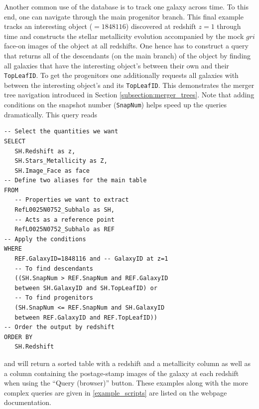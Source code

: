Another common use of the database is to track one galaxy across time. To this
end, one can navigate through the main progenitor branch. This final example
tracks an interesting object (\GalaxyID$=1848116$) discovered at redshift $z=1$
through time and constructs the stellar metallicity evolution accompanied by
the mock $gri$ face-on images of the object at all redshifts. One hence has to
construct a query that returns all of the descendants (on the main branch) of
the object by finding all galaxies that have the interesting object's \GalaxyID
between their own \GalaxyID and their {\tt TopLeafID}. To get the progenitors
one additionally requests all galaxies with \GalaxyID between the interesting
object's \GalaxyID and its {\tt TopLeafID}.  This demonstrates the merger tree
navigation introduced in Section \ref{subsection:merger_trees}. Note that
adding conditions on the snapshot number ({\tt SnapNum}) helps speed up the
queries dramatically. This query reads

{
\sqlstyle
{
\footnotesize
\begin{lstlisting}[numbers = none,caption={Returns the evolution along the main
branch of stellar metallicity with redshift of a given galaxy with its images.
To return the evolution along all branches replace \tt{TopLeafID} with
\tt{LastProjID} in line 20.}]
-- Select the quantities we want
SELECT      
   SH.Redshift as z,      
   SH.Stars_Metallicity as Z,      
   SH.Image_Face as face      
-- Define two aliases for the main table
FROM      
   -- Properties we want to extract      
   RefL0025N0752_Subhalo as SH,      
   -- Acts as a reference point      
   RefL0025N0752_Subhalo as REF      
-- Apply the conditions      
WHERE      
   REF.GalaxyID=1848116 and -- GalaxyID at z=1      
   -- To find descendants      
   ((SH.SnapNum > REF.SnapNum and REF.GalaxyID      
   between SH.GalaxyID and SH.TopLeafID) or 
   -- To find progenitors  
   (SH.SnapNum <= REF.SnapNum and SH.GalaxyID  
   between REF.GalaxyID and REF.TopLeafID))  
-- Order the output by redshift      
ORDER BY      
   SH.Redshift
\end{lstlisting}
}
}
\noindent and will return a sorted table with a redshift and a metallicity
column as well as a column containing the postage-stamp images of the galaxy at
each redshift when using the ``Query (browser)'' button. These examples along with
the more complex queries are given in \ref{example_scripts} are listed on the
webpage documentation.
